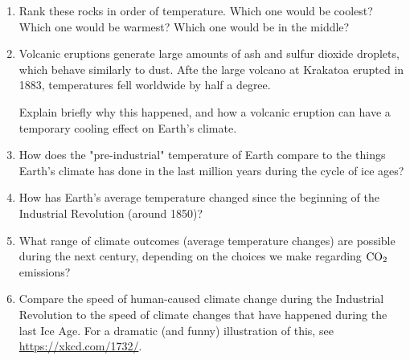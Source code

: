 \documentclass[12pt]{article}
\begin{document}
\begin{enumerate}
    \item Rank these rocks in order of temperature. Which one would be coolest? Which one would be warmest? Which one would be in the middle?
    
    \vspace{1in}

    \item Volcanic eruptions generate large amounts of ash and sulfur dioxide droplets, which behave similarly to dust. Afte the large volcano at Krakatoa erupted in 1883, temperatures fell worldwide by half a degree.

	\bigskip

	Explain briefly why this happened, and how a volcanic eruption can have a temporary cooling effect on Earth's climate.
    \vspace{1.5in}
    \item How does the "pre-industrial" temperature of Earth compare to the things Earth's climate has done in the last million years during the cycle
	of ice ages?
    \vspace{1in}
    \item How has Earth's average temperature changed since the beginning of the Industrial Revolution (around 1850)?
    \vspace{1in}
    \item What range of climate outcomes (average temperature changes) are possible during the next century, depending on the choices we make regarding $\rm CO_2$ emissions?
    \vspace{1.5in}
    \item Compare the speed of human-caused climate change during the Industrial Revolution to the speed of climate changes that have happened during the last Ice Age. For a dramatic (and funny) illustration of this, see \url{https://xkcd.com/1732/}.
\end{enumerate}
\end{document}
